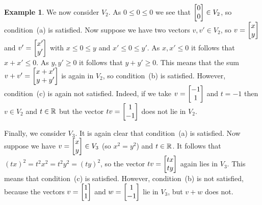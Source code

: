 \documentclass[reqno]{amsart}
\theoremstyle{definition}
\newtheorem{example}[theorem]{Example}
\begin{document}
\begin{example}
 We now consider $V_2$.  As $0\leq 0\leq 0$ we see that
 $\left[\begin{matrix} 0\\ 0\end{matrix}\right]\in V_2$, so condition~(a) is satisfied.  Now suppose
 we have two vectors $v,v'\in V_2$, so $v=\left[\begin{matrix} x\\y\end{matrix}\right]$ and
 $v'=\left[\begin{matrix} x'\\y'\end{matrix}\right]$ with $x\leq 0\leq y$ and $x'\leq 0\leq y'$.  As
 $x,x'\leq 0$ it follows that $x+x'\leq 0$.  As $y,y'\geq 0$ it
 follows that $y+y'\geq 0$.  This means that the sum
 $v+v'=\left[\begin{matrix} x+x'\\y+y'\end{matrix}\right]$ is again in $V_2$, so condition~(b) is
 satisfied.  However, condition~(c) is again not satisfied.  Indeed,
 if we take $v=\left[\begin{matrix} -1\\ 1\end{matrix}\right]$ and $t=-1$ then $v\in V_2$ and
 $t\in{\mathbb{R}}$ but the vector $tv=\left[\begin{matrix} 1\\-1\end{matrix}\right]$ does not lie in $V_2$.

 Finally, we consider $V_3$.  It is again clear that condition~(a) is
 satisfied.  Now suppose we have $v=\left[\begin{matrix} x\\ y\end{matrix}\right]\in V_3$ (so
 $x^2=y^2$) and $t\in{\mathbb{R}}$.  It follows that
 $(tx)^2=t^2x^2=t^2y^2=(ty)^2$, so the vector $tv=\left[\begin{matrix} tx\\ ty\end{matrix}\right]$
 again lies in $V_3$.  This means that condition~(c) is satisfied.
 However, condition~(b) is not satisfied, because the vectors
 $v=\left[\begin{matrix} 1\\1\end{matrix}\right]$ and $w=\left[\begin{matrix} 1\\-1\end{matrix}\right]$ lie in $V_3$, but $v+w$
 does not.

 \bigskip


\end{example}
\end{document}
